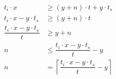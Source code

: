 \begin{align*}
                         t_i \cdot x & \geq (y + n) \cdot t + y \cdot t_s\\
           t_i \cdot x - y \cdot t_s & \geq (y + n) \cdot t\\
\dfrac{t_i \cdot x - y \cdot t_s}{t} & \geq y + n\\
                     n & \leq \dfrac{t_i \cdot x - y \cdot t_s}{t} - y\\
                     n & = \left\lceil \dfrac{t_i \cdot x - y \cdot t_s}{t} - y \right\rceil\\

\end{align*}
